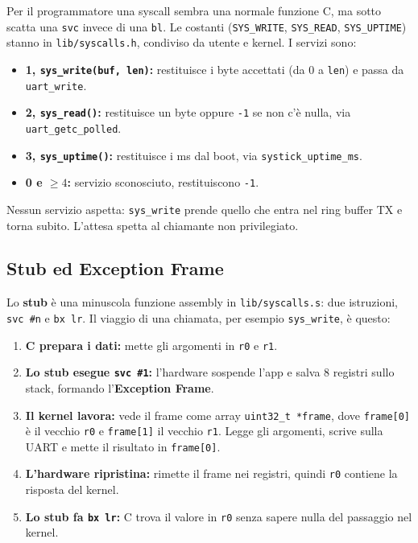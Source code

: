 Per il programmatore una syscall sembra una normale funzione C, ma sotto scatta una \texttt{svc} invece di una \texttt{bl}. Le costanti (\texttt{SYS\_WRITE}, \texttt{SYS\_READ}, \texttt{SYS\_UPTIME}) stanno in \texttt{lib/syscalls.h}, condiviso da utente e kernel. I servizi sono:
\begin{itemize}
    \item \textbf{1, \texttt{sys\_write(buf, len)}:} restituisce i byte accettati (da 0 a \texttt{len}) e passa da \texttt{uart\_write}.
    \item \textbf{2, \texttt{sys\_read()}:} restituisce un byte oppure \texttt{-1} se non c'è nulla, via \texttt{uart\_getc\_polled}.
    \item \textbf{3, \texttt{sys\_uptime()}:} restituisce i ms dal boot, via \texttt{systick\_uptime\_ms}.
    \item \textbf{0 e $\ge 4$:} servizio sconosciuto, restituiscono \texttt{-1}.
\end{itemize}
 
Nessun servizio aspetta: \texttt{sys\_write} prende quello che entra nel ring buffer TX e torna subito. L'attesa spetta al chiamante non privilegiato.
 
\subsection*{Stub ed Exception Frame}
Lo \textbf{stub} è una minuscola funzione assembly in \texttt{lib/syscalls.s}: due istruzioni, \texttt{svc \#n} e \texttt{bx lr}. Il viaggio di una chiamata, per esempio \texttt{sys\_write}, è questo:
\begin{enumerate}
    \item \textbf{C prepara i dati:} mette gli argomenti in \texttt{r0} e \texttt{r1}.
    \item \textbf{Lo stub esegue \texttt{svc \#1}:} l'hardware sospende l'app e salva 8 registri sullo stack, formando l'\textbf{Exception Frame}.
    \item \textbf{Il kernel lavora:} vede il frame come array \texttt{uint32\_t *frame}, dove \texttt{frame[0]} è il vecchio \texttt{r0} e \texttt{frame[1]} il vecchio \texttt{r1}. Legge gli argomenti, scrive sulla UART e mette il risultato in \texttt{frame[0]}.
    \item \textbf{L'hardware ripristina:} rimette il frame nei registri, quindi \texttt{r0} contiene la risposta del kernel.
    \item \textbf{Lo stub fa \texttt{bx lr}:} C trova il valore in \texttt{r0} senza sapere nulla del passaggio nel kernel.
\end{enumerate}
 
